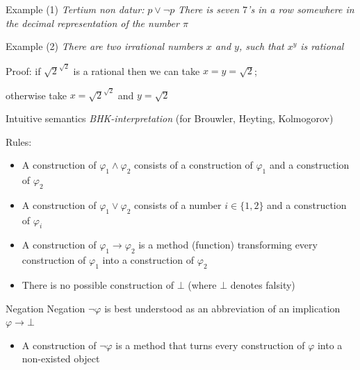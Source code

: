\documentclass[sans]{beamer}
\begin{document}
\begin{frame}{Example (1)}
  \emph{Tertium non datur:} $p \vee \lnot p$
  \pause
  \vfill
  \emph{
    There is seven $7$'s in a row somewhere in
    the decimal representation
    of the number $\pi$
  }
\end{frame}

\begin{frame}{Example (2)}
  \emph{
    There are two irrational numbers $x$ and $y$, such that $x^y$ is rational
  }
  \vfill
  \begin{block}{Proof:}
    if $\sqrt{2}^{\sqrt{2}}$ is a rational then we can take $x = y = \sqrt{2}$;

    otherwise take $x = \sqrt{2}^{\sqrt{2}}$ and $y = \sqrt{2}$
  \end{block}
\end{frame}

\begin{frame}{Intuitive semantics}
  \emph{BHK-interpretation} (for Brouwler, Heyting, Kolmogorov)

  \begin{block}{Rules:}
    \begin{itemize}
      \item A construction of $\varphi_1 \wedge \varphi_2$ consists of
            a construction of $\varphi_1$ and a construction of $\varphi_2$
      \item A construction of $\varphi_1 \vee \varphi_2$ consists of a
            number $i \in \{1, 2\}$ and a construction of $\varphi_i$
      \item A construction of $\varphi_1 \to \varphi_2$ is a method (function)
            transforming every construction of $\varphi_1$ into a construction
            of $\varphi_2$
      \item There is no possible construction of $\bot$ (where $\bot$ denotes falsity)
    \end{itemize}
  \end{block}
\end{frame}

\begin{frame}{Negation}
  Negation $\lnot \varphi$ is best understood as an abbreviation of an implication $\varphi \to \bot$

  \begin{itemize}
    \item A construction of $\lnot \varphi$ is a method that turns every construction of
      $\varphi$ into a non-existed object
  \end{itemize}
\end{frame}
\end{document}
